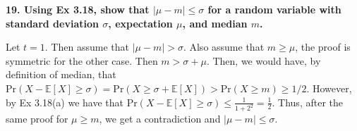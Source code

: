 \documentclass[letterpaper, 12pt]{article}
\newcommand{\E}{ \mathbb{E} }
\newcommand{\Pr}{ \text{Pr} }
\begin{document}
\nodindent\textbf{19. Using Ex 3.18, show that $|\mu - m| \leq \sigma$ for a random variable with standard deviation $\sigma$, expectation $\mu$, and median $m$.}

Let $t = 1$. Then assume that $|\mu - m| > \sigma$. Also assume that $m\geq\mu$, the proof is symmetric for the other case. Then $m > \sigma + \mu$. Then, we would have, by definition of median, that $\Pr(X - \E[X] \geq \sigma) = \Pr(X \geq \sigma + \E[X]) > \Pr(X \geq m) \geq 1/2$. However, by Ex 3.18(a) we have that $\Pr(X - \E[X] \geq \sigma) \leq \frac{1}{1+2^2} = \frac{1}{2}.$ Thus, after the same proof for $\mu \geq m$, we get a contradiction and $|\mu - m| \leq \sigma$.
\end{document}
